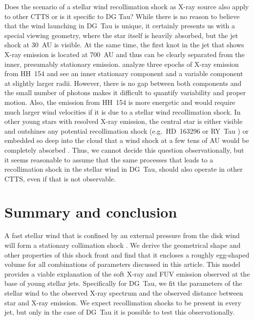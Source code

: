 \documentclass{emulateapj}
\begin{document}
Does the scenario of a stellar wind recollimation shock as X-ray source also apply to other CTTS or is it specific to DG Tau? While there is no reason to believe that the wind launching in DG~Tau is unique, it certainly presents us with a special viewing geometry, where the star itself is heavily absorbed, but the jet shock at 30~AU is visible. At the same time, the first knot in the jet that shows X-ray emission is located at 700~AU and thus can be clearly separated from the inner, presumably stationary emission. \citet{2011A&A...530A.123S} analyze three epochs of X-ray emission from HH~154 and see an inner stationary component and a variable component at slightly larger radii. However, there is no gap between both components and the small number of photons makes it difficult to quantify variability and proper motion. Also, the emission from HH~154 is more energetic and would require much larger wind velocities if it is due to a stellar wind recollimation shock. In other young stars with resolved X-ray emission, the central star is either visible and outshines any potential recollimation shock (e.g.\ HD~163296 \citep{2005ApJ...628..811S,2013A&A...552A.142G} or RY~Tau \citep{2014ApJ...788..101S}) or embedded so deep into the cloud that a wind shock at a few tens of AU would be completely absorbed \citep[e.g.\ HH80/81][]{2004ApJ...605..259P}. Thus, we cannot decide this question observationally, but it seems reasonable to assume that the same processes that leads to a recollimation shock in the stellar wind in DG~Tau, should also operate in other CTTS, even if that is not observable.



\section{Summary and conclusion}
\label{sect:summary}
A fast stellar wind that is confined by an external pressure from the disk wind will form a stationary collimation shock \citep{2012MNRAS.422.2282K}. We derive the geometrical shape and other properties of this shock front and find that it encloses a roughly egg-shaped volume for all combinations of parameters discussed in this article. This model provides a viable explanation of the soft X-ray and FUV emission observed at the base of young stellar jets. Specifically for DG~Tau, we fit the parameters of the stellar wind to the observed X-ray spectrum and the observed distance between star and X-ray emission.  We expect recollimation shocks to be present in every jet, but only in the case of DG~Tau it is possible to test this observationally.
\end{document}
